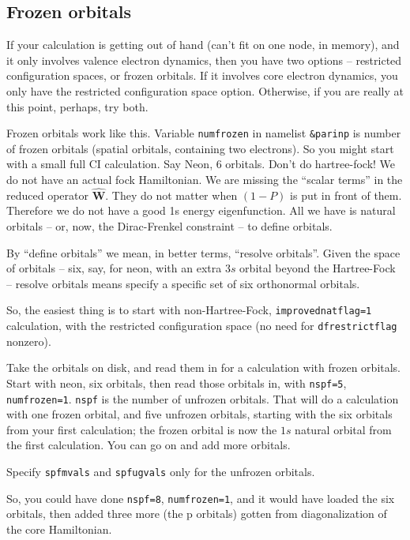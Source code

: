 \documentclass[10pt,leqno, oneside]{book}
\begin{document}
\subsection{Frozen orbitals \label{frosect}}

If your calculation is getting out of hand (can't fit on one node, in memory), 
and it only involves valence electron dynamics, then you have two options -- restricted configuration spaces, or frozen orbitals.
If it involves core electron dynamics, you only have the restricted configuration space option.
Otherwise, if you are really at this point, perhaps, try both.

Frozen orbitals work like this.  Variable \verb#numfrozen# in namelist \verb#&parinp# is number of frozen orbitals (spatial orbitals, containing
two electrons).  So you might start with a small full CI calculation.  Say Neon, 6 orbitals.  Don't do hartree-fock!  We do not have an actual fock Hamiltonian.
We are missing the ``scalar terms'' in the reduced operator $\mathbf{\hat{W}}$.  They do not matter when $(1-P)$ is put in front of them.  
Therefore we do not have a good 1s energy eigenfunction.  All we have is natural orbitals 
-- or, now, the Dirac-Frenkel constraint -- to define orbitals.

By ``define orbitals'' we mean, in better terms, ``resolve orbitals''.  Given the space of orbitals -- six, say, for neon, with an extra $3s$ orbital beyond
the Hartree-Fock -- resolve orbitals means specify a specific set of six orthonormal orbitals.

So, the easiest thing is to start with non-Hartree-Fock, \verb#improvednatflag=1# calculation, with the restricted configuration space (no need for
\verb#dfrestrictflag# nonzero).

Take the orbitals on disk, and read them in for a calculation with frozen orbitals.  Start with neon, six orbitals, then read those orbitals in,
with \verb#nspf=5#, \verb#numfrozen=1#.  \verb#nspf# is the number
of unfrozen orbitals.
That will do a calculation with one frozen orbital, and five unfrozen orbitals, starting with the six
orbitals from your first calculation; the frozen orbital is now the $1s$ natural orbital from the first calculation.  You can go on and add more orbitals.

Specify \verb#spfmvals# and \verb#spfugvals# only for the unfrozen orbitals.

So, you could have done \verb#nspf=8#, \verb#numfrozen=1#, and it would have loaded the six orbitals, then added three more (the p orbitals) 
gotten from diagonalization
of the core Hamiltonian.  
  
\end{document}
